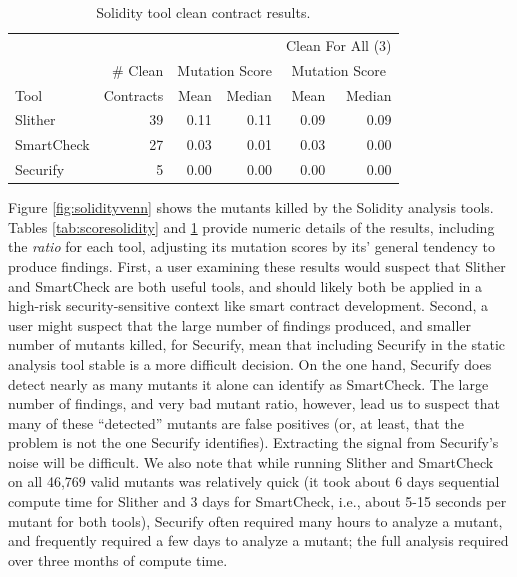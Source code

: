 \begin{table}
  \begin{tabular}{l|r|r|r|r|r}
    & & \multicolumn{2}{|c|}{} & \multicolumn{2}{|c}{Clean For All (3)} \\
    & \# Clean & \multicolumn{2}{|c|}{Mutation Score} &  \multicolumn{2}{|c}{Mutation Score}\\
    Tool & Contracts & Mean & Median & Mean & Median\\
    \hline
    \hline
    Slither & 39 & 0.11 & 0.11 & 0.09 & 0.09 \\
    \hline
    SmartCheck & 27 & 0.03 & 0.01 & 0.03 & 0.00 \\
    \hline
    Securify & 5 & 0.00 & 0.00 & 0.00 & 0.00 \\
    \hline
  \end{tabular}
  \caption{Solidity tool clean contract results.}
  \label{tab:cleansolidity}
\end{table}


Figure \ref{fig:solidityvenn} shows the mutants killed by the Solidity analysis tools.  Tables \ref{tab:scoresolidity} and \ref{tab:cleansolidity} provide numeric details of the results, including the \emph{ratio} for each tool, adjusting its mutation scores by its' general tendency to produce findings.  First, a user examining these results would suspect that Slither and SmartCheck are both useful tools, and should likely both be applied in a high-risk security-sensitive context like smart contract development.  Second, a user might suspect that the large number of findings produced, and smaller number of mutants killed, for Securify, mean that including Securify in the static analysis tool stable is a more difficult decision.  On the one hand, Securify does detect nearly as many mutants it alone can identify as SmartCheck.  The large number of findings, and very bad mutant ratio, however, lead us to suspect that many of these ``detected'' mutants are false positives (or, at least, that the problem is not the one Securify identifies).  Extracting the signal from Securify's noise will be difficult.  We also note that while running Slither and SmartCheck on all 46,769 valid mutants was relatively quick (it took about 6 days sequential compute time for Slither and 3 days for SmartCheck, i.e., about 5-15 seconds per mutant for both tools), Securify often required many hours to analyze a mutant, and frequently required a few days to analyze a mutant; the full analysis required over three months of compute time.

